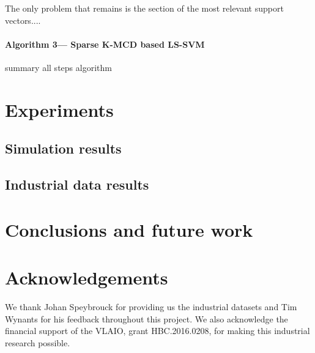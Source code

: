 \documentclass[preprint,12pt]{elsarticle}
\begin{document}
The only problem that remains is the section of the most relevant support vectors....

\paragraph{Algorithm 3--- Sparse K-MCD based LS-SVM}

summary all steps algorithm

\section{Experiments} 
\subsection{Simulation results} 
\subsection{Industrial data results} 

\section{Conclusions and future work}

\section*{Acknowledgements}

We thank Johan Speybrouck for providing us the industrial datasets and Tim Wynants for his feedback throughout this project. We also acknowledge the financial support of the VLAIO, grant HBC.2016.0208, for making this industrial research possible.





%





%
%
%
\end{document}
